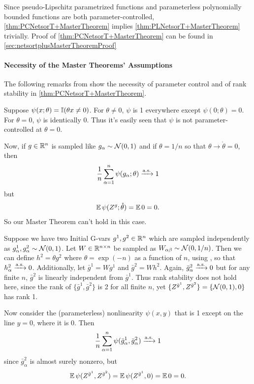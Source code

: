 \documentclass[main.tex]{subfiles}
\begin{document}
Since pseudo-Lipschitz parametrized functions and parameterless polynomially bounded functions are both parameter-controlled, \cref{thm:PCNetsorT+MasterTheorem} implies \cref{thm:PLNetsorT+MasterTheorem} trivially.
Proof of \cref{thm:PCNetsorT+MasterTheorem} can be found in \cref{sec:netsortplusMasterTheoremProof}

\paragraph{Necessity of the Master Theorems' Assumptions}

The following remarks from \citep{yangTP1} show the necessity of parameter control and of rank stability in \cref{thm:PCNetsorT+MasterTheorem}.
\begin{rem}
 Suppose $\psi(x;\theta)=\mathbb{I}(\theta x\ne0)$. For $\theta\ne0$, $\psi$ is 1 everywhere except $\psi(0;\theta)=0$. For $\theta=0$, $\psi$ is identically 0. Thus it's easily seen that $\psi$ is not parameter-controlled at $\theta=0$.

Now, if $g\in\mathbb{R}^{n}$ is sampled like $g_{\alpha}\sim\mathcal{N}(0,1)$ and if $\theta=1/n$ so that $\theta\to\mathring{\theta}=0$, then 
\[
\frac{1}{n}\sum_{\alpha=1}^{n}\psi(g_{\alpha};\theta)\xrightarrow{\mathrm{a.s.}}1
\]
but 
\[
\operatorname*{\mathbb{E}}\psi(Z^{g};\mathring{\theta})=\operatorname*{\mathbb{E}}0=0.
\]
So our Master Theorem can't hold in this case. 
\end{rem}

\begin{rem}
\label{remk:necessityRankStab} Suppose we have two Initial G-vars $g^{1},g^{2}\in\mathbb{R}^{n}$ which are sampled independently as $g_{\alpha}^{1},g_{\alpha}^{2}\sim\mathcal{N}(0,1)$. Let $W\in\mathbb{R}^{n\times n}$ be sampled as $W_{\alpha\beta}\sim\mathcal{N}(0,1/n)$. Then we can define $h^{2}=\theta g^{2}$ where $\theta=\exp(-n)$ as a function of $n$, using , so that $h_{\alpha}^{2}\xrightarrow{\mathrm{a.s.}}0$. Additionally, let $\bar{g}^{1}=Wg^{1}$ and $\bar{g}^{2}=Wh^{2}$. Again, $\bar{g}_{\alpha}^{2}\xrightarrow{\mathrm{a.s.}}0$ but for any finite $n$, $\bar{g}^{2}$ is linearly independent from $\bar{g}^{1}$. Thus rank stability does not hold here, since the rank of $\{\bar{g}^{1},\bar{g}^{2}\}$ is 2 for all finite $n$, yet $\{Z^{\bar{g}^{1}},Z^{\bar{g}^{2}}\}=\{\mathcal{N}(0,1),0\}$ has rank 1.

Now consider the (parameterless) nonlinearity $\psi(x,y)$ that is 1 except on the line $y=0$, where it is 0. Then 
\[
\frac{1}{n}\sum_{\alpha=1}^{n}\psi(\bar{g}_{\alpha}^{1},\bar{g}_{\alpha}^{2})\xrightarrow{\mathrm{a.s.}}1
\]
since $\bar{g}_{\alpha}^{2}$ is almost surely nonzero, but 
\[
\operatorname*{\mathbb{E}}\psi(Z^{\bar{g}^{1}},Z^{\bar{g}^{2}})=\operatorname*{\mathbb{E}}\psi(Z^{\bar{g}^{1}},0)=\operatorname*{\mathbb{E}}0=0.
\]
\end{rem}
\end{document}
